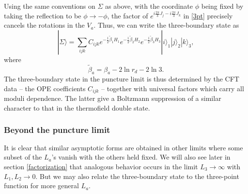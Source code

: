\documentclass[12pt]{article}
\newcommand{\be}{\begin{equation}}
\newcommand{\ee}{\end{equation}}
\numberwithin{equation}{section}
\begin{document}
Using the same conventions on $\Sigma$ as above, with the coordinate $\phi$ being fixed by taking the reflection to be $\phi \rightarrow - \phi$, the factor of  $e^{i \frac{2\pi}{3} J_j - i \frac{2\pi}{3} J_k}$ in \eqref{3pt} precisely cancels the rotations in the $V_a$.  Thus, we can write the three-boundary state as
\be \label{gen3stateplane}
|\Sigma \rangle = \sum_{ijk}  C_{ijk} e^{-\frac{1}{2}\tilde \beta_1 H_1}e^{-\frac{1}{2}\tilde \beta_2 H_2}e^{-\frac{1}{2}\tilde \beta_3 H_3}    |i\rangle_1 |j\rangle_2 |k\rangle_3,
\ee
where
\be
\tilde \beta_a = \beta_a - 2 \ln r_d  - 2 \ln 3.
\ee
The three-boundary state in the puncture limit is thus determined by the CFT data -- the OPE coefficients $C_{ijk}$ -- together with universal factors which carry all moduli dependence. The latter give a Boltzmann suppression of a similar character to that in the thermofield double state.

\subsubsection{Beyond the puncture limit}

It is clear that similar asymptotic forms are obtained in other limits where some subset of the $L_a$'s vanish with the others held fixed.  We will also see later in section \ref{factorization} that analogous behavior occurs in the limit $L_3 \rightarrow \infty$ with $L_1, L_2 \rightarrow 0$.  But we may also relate the three-boundary state to the three-point function for more general $L_a$.
\end{document}
